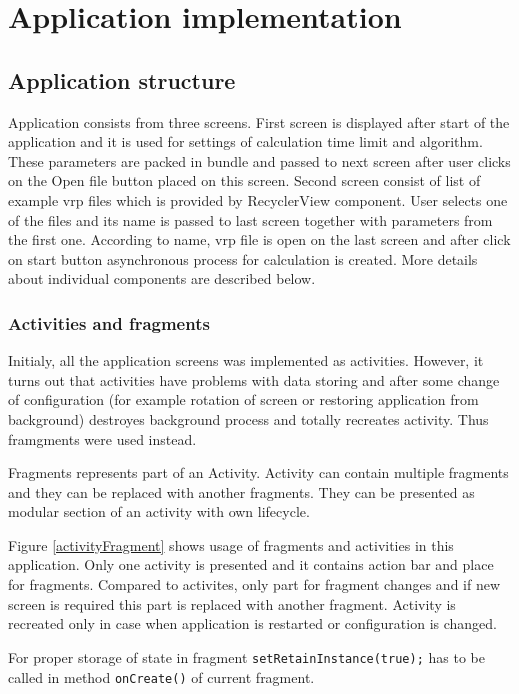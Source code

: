 \section{Application implementation}

\subsection{Application structure} %
Application consists from three screens. First screen is displayed after start of the application and it is used for
settings of calculation time limit and algorithm. These parameters are packed in bundle and passed to next screen after
user clicks on the Open file button placed on this screen. Second screen consist of list of example vrp files which is
provided by RecyclerView component. User selects one of the files and its name is passed to last screen together with
parameters from the first one. According to name, vrp file is open on the last screen and after click on start button
asynchronous process for calculation is created. More details about individual components are described below.

\subsubsection{Activities and fragments}
Initialy, all the application screens was implemented as activities. However, it turns out that activities have problems
with data storing and after some change of configuration (for example rotation of screen or restoring application from
background) destroyes background process and totally recreates activity. Thus framgments were used instead.

Fragments represents part of an Activity. Activity can contain multiple fragments and they can be replaced with another
fragments. They can be presented as modular section of an activity with own lifecycle.

Figure \ref{activityFragment} shows usage of fragments and activities in this application. Only one activity is presented and it
contains action bar and place for fragments. Compared to activites, only part for fragment changes and if new screen is
required this part is replaced with another fragment. Activity is recreated only in case when application is restarted
or configuration is changed.

For proper storage of state in fragment \texttt{setRetainInstance(true);} has to be called in method \texttt{onCreate()}
of current fragment.

